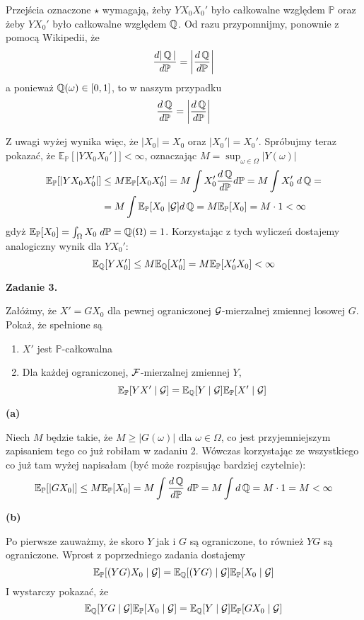 \documentclass{article}
\newcommand{\E}{\mathbb{E}}
\renewcommand{\P}{\mathbb{P}}
\begin{document}
Przejścia oznaczone $\star$ wymagają, żeby $YX_0X_0'$ było całkowalne względem $\P$ oraz żeby $YX_0'$ było całkowalne względem $\operatorname{\mathbb{Q}}$. Od razu przypomnijmy, ponownie z pomocą Wikipedii, że
$$\frac{d|\Q|}{d\P}=\left|\frac{d\Q}{d\P}\right|$$
a ponieważ $\operatorname{\mathbb{Q}}(\omega)\in[0,1]$, to w naszym przypadku
$$\frac{d\Q}{d\P}=\left|\frac{d\Q}{d\P}\right|$$

Z uwagi wyżej wynika więc, że $|X_0|=X_0$ oraz $|X_0'|=X_0'$. Spróbujmy teraz pokazać, że $\E_{\P}[|YX_0X_0']]<\infty$, oznaczając $M=\sup_{\omega\in\Omega} |Y(\omega)|$
\begin{align*}
  \E_{\P}[|YX_0X_0'|]&\leq M\E_{\P}[X_0X_0']=M\int X_0'\frac{d\Q}{d\P}d\P=M\int X_0'\;d\Q=\\
                     &=M\int\E_{\P}[X_0\;|\set{G}]d\Q=M\E_{\P}[X_0]=M\cdot 1<\infty
\end{align*}
gdyż $\E_{\P}[X_0]=\int_{\Omega}X_0\;d\P=\Q(\Omega)=1$. Korzystając z tych wyliczeń dostajemy analogiczny wynik dla $YX_0'$:
$$\E_{\Q}[YX_0']\leq M\E_{\Q}[X_0']=M\E_{\P}[X_0'X_0]<\infty$$
\bigskip

{\bfseries{\large\color{orange}Zadanie 3.}

  Załóżmy, że $X'=GX_0$ dla pewnej ograniczonej $\mathcal{G}$-mierzalnej zmiennej losowej $G$. Pokaż, że spełnione są
  \begin{enumerate}[label=(\alph*)]
    \item $X'$ jest $\P$-całkowalna
    \item Dla każdej ograniczonej, $\mathcal{F}$-mierzalnej zmiennej $Y$,
      $$\E_{\P}[YX'\;|\;\set{G}]=\E_{\Q}[Y\;|\;\set{G}]\E_{\P}[X'\;|\;\set{G}]$$
  \end{enumerate}
}

\textbf{\color{green}(a)}

Niech $M$ będzie takie, że $M\geq |G(\omega)|$ dla $\omega\in\Omega$, co jest przyjemniejszym zapisaniem tego co już robiłam w zadaniu 2. Wówczas korzystając ze wszystkiego co już tam wyżej napisałam (być może rozpisując bardziej czytelnie):
\begin{align*}
  \E_{\P}[|GX_0|]\leq M\E_{\P}[X_0]=M\int\frac{d\Q}{d\P}\;d\P=M\int d\Q=M\cdot 1=M<\infty
\end{align*}

\textbf{\color{green}(b)}

Po pierwsze zauważmy, że skoro $Y$ jak i $G$ są ograniczone, to również $YG$ są ograniczone. Wprost z poprzedniego zadania dostajemy
$$\E_{\P}[(YG)X_0\;|\;\set{G}]=\E_{\Q}[(YG)\;|\;\set{G}]\E_{\P}[X_0\;|\;\set{G}]$$
I wystarczy pokazać, że 
$$\E_{\Q}[YG\;|\;\set{G}]\E_{\P}[X_0\;|\;\set{G}]=\E_{\Q}[Y\;|\;\set{G}]\E_{\P}[GX_0\;|\;\set{G}]$$
\end{document}
